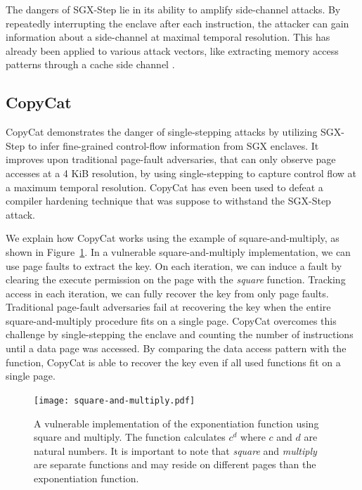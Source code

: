 \documentclass{llncs}
\begin{document}
The dangers of SGX-Step lie in its ability to amplify side-channel attacks.
By repeatedly interrupting the enclave after each instruction, the attacker can
gain information about a side-channel at maximal temporal resolution.
This has already been applied to various attack vectors, like extracting memory
access patterns through a cache side channel \cite{HahnelCP17}.

\subsection{CopyCat}

CopyCat \cite{MoghimiBHPS20} demonstrates the danger of single-stepping attacks
by utilizing SGX-Step to infer fine-grained control-flow information from SGX
enclaves.
It improves upon traditional page-fault adversaries, that can only observe page
accesses at a 4 KiB resolution, by using single-stepping to capture control
flow at a maximum temporal resolution.
CopyCat has even been used to defeat a compiler hardening technique
\cite{HosseinzadehLLP18} that was suppose to withstand the SGX-Step attack.

We explain how CopyCat works using the example of square-and-multiply,
as shown in Figure~\ref{fig:square-and-multiply}.
In a vulnerable square-and-multiply implementation, we can use page faults to
extract the key.
On each iteration, we can induce a fault by clearing the execute permission on
the page with the \emph{square} function.
Tracking access in each iteration, we can fully recover the key from only page
faults.
Traditional page-fault adversaries fail at recovering the key when the entire
square-and-multiply procedure fits on a single page.
CopyCat overcomes this challenge by single-stepping the enclave and counting
the number of instructions until a data page was accessed.
By comparing the data access pattern with the function, CopyCat is able to
recover the key even if all used functions fit on a single page.

\begin{figure}[t!]
  \centering
  \texttt{[image: square-and-multiply.pdf]}
  \caption{A vulnerable implementation of the exponentiation function using square and multiply.
    The function calculates $c^d$ where $c$ and $d$ are natural numbers.
    It is important to note that \emph{square} and \emph{multiply} are separate functions
    and may reside on different pages than the exponentiation function.}
  \label{fig:square-and-multiply}
\end{figure}
\end{document}
